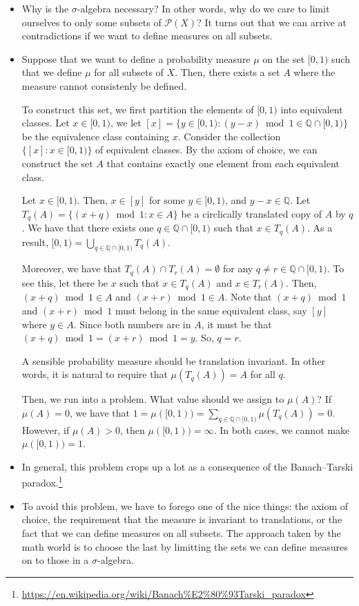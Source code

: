 \documentclass[10pt]{article}
\newcommand{\mcal}[1]{\mathcal{#1}}
\begin{document}
\begin{itemize}
  \item Why is the $\sigma$-algebra necessary? In other words, why do we care to limit ourselves to only some subsets of $\mcal{P}(X)$? It turns out that we can arrive at contradictions if we want to define measures on all subsets.
  
  \item Suppose that we want to define a probability measure $\mu$ on the set $[0,1)$ such that we define $\mu$ for all subsets of $X$. Then, there exists a set $A$ where the measure cannot consistenly be defined. 
  
  To construct this set, we first partition the elements of $[0,1)$ into equivalent classes. Let $x \in [0,1)$, we let $[x] = \{ y \in [0,1) : (y-x) \bmod 1 \in \mathbb{Q} \cap [0,1) \}$ be the equivalence class containing $x$. Consider the collection $\{ [x] : x \in [0,1) \}$ of equivalent classes. By the axiom of choice, we can construct the set $A$ that contains exactly one element from each equivalent class.

  Let $x \in [0,1)$. Then, $x \in [y]$ for some $y \in [0,1)$, and $y - x \in \mathbb{Q}$. Let $T_{q}(A) = \{ (x + q) \bmod 1 : x \in A \}$ be a circlically translated copy of $A$ by $q$. We have that there exists one $q \in \mathbb{Q} \cap [0,1)$ such that $x \in T_q(A)$. As a result, $[0,1) = \bigcup_{q \in \mathbb{Q} \cap [0,1)} T_q(A)$.

  Moreover, we have that $T_{q}(A) \cap T_{r}(A) = \emptyset$ for any $q \neq r \in \mathbb{Q} \cap [0,1)$. To see this, let there be $x$ such that $x \in T_q(A)$ and $x \in T_r(A)$. Then, $(x+q) \bmod 1 \in A$ and $(x+r) \bmod 1 \in A$. Note that $(x+q) \bmod 1$ and $(x+r) \bmod 1$ must belong in the same equivalent class, say $[y]$ where $y \in A$. Since both numbers are in $A$, it must be that $(x+q) \bmod 1 = (x+r) \bmod 1 = y$. So, $q = r$.

  A sensible probability measure should be translation invariant. In other words, it is natural to require that $\mu(T_q(A)) = A$ for all $q$. 

  Then, we run into a problem. What value should we assign to $\mu(A)$? If $\mu(A) = 0$, we have that $1 = \mu([0,1)) = \sum_{q \in \mathbb{Q} \cap [0,1)} \mu(T_q(A)) = 0.$ However, if $\mu(A) > 0$, then $\mu([0,1)) = \infty$. In both cases, we cannot make $\mu([0,1)) = 1$.

  \item In general, this problem crops up a lot as a consequence of the Banach--Tarski paradox.\footnote{\url{https://en.wikipedia.org/wiki/Banach\%E2\%80\%93Tarski_paradox}}

  \item To avoid this problem, we have to forego one of the nice things: the axiom of choice, the requirement that the measure is invariant to translations, or the fact that we can define measures on all subsets. The approach taken by the math world is to choose the last by limitting the sets we can define measures on to those in a $\sigma$-algebra.
\end{itemize}
\end{document}
